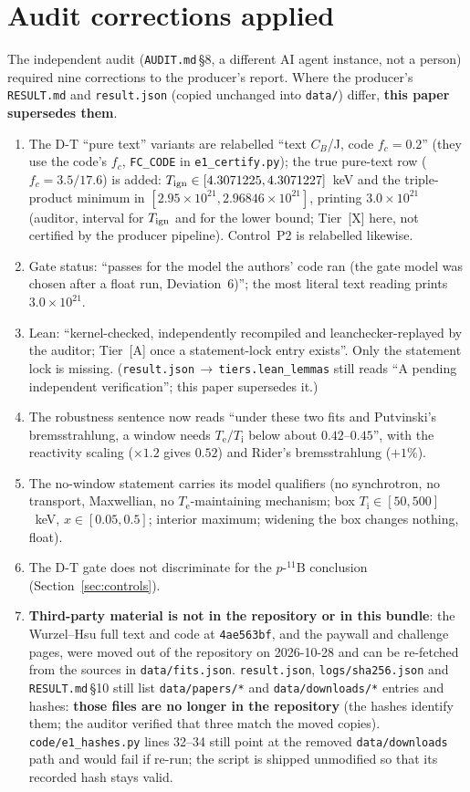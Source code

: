 \documentclass[10pt]{article}
\newcommand{\tier}[1]{\textsf{[#1]}}
\newcommand{\tA}{\tier{A}}
\newcommand{\tX}{\tier{X}}
\newcommand{\Te}{T_{\mathrm e}}
\newcommand{\Ti}{T_{\mathrm i}}
\newcommand{\pB}{p\text{-}{}^{11}\mathrm{B}}
\begin{document}
\section{Audit corrections applied}\label{sec:corr}
The independent audit (\texttt{AUDIT.md}\,\S8, a different AI agent instance, not a person) required nine corrections to the producer's report. Where the producer's \texttt{RESULT.md} and \texttt{result.json} (copied unchanged into \texttt{data/}) differ, \textbf{this paper supersedes them}.
\begin{enumerate}\itemsep=1pt
\item[C1.] The D-T ``pure text'' variants are relabelled ``text $C_B$/J, code $f_c=0.2$'' (they use the code's $f_c$, \texttt{FC\_CODE} in \texttt{e1\_certify.py}); the true pure-text row ($f_c=3.5/17.6$) is added: $T_{\rm ign}\in[4.3071225,4.3071227]$~keV and the triple-product minimum in $[2.95\times10^{21},2.96846\times10^{21}]$, printing $3.0\times10^{21}$ (auditor, interval for $T_{\rm ign}$ and for the lower bound; Tier~\tX{} here, not certified by the producer pipeline). Control~P2 is relabelled likewise.
\item[C2.] Gate status: ``passes for the model the authors' code ran (the gate model was chosen after a float run, Deviation~6)''; the most literal text reading prints $3.0\times10^{21}$.
\item[C3.] Lean: ``kernel-checked, independently recompiled and leanchecker-replayed by the auditor; Tier~\tA{} once a statement-lock entry exists''. Only the statement lock is missing. (\texttt{result.json}\,$\to$\,\texttt{tiers.lean\_lemmas} still reads ``A pending independent verification''; this paper supersedes it.)
\item[C4.] The robustness sentence now reads ``under these two fits and Putvinski's bremsstrahlung, a window needs $\Te/\Ti$ below about $0.42$--$0.45$'', with the reactivity scaling ($\times1.2$ gives $0.52$) and Rider's bremsstrahlung ($+1\%$).
\item[C5.] The no-window statement carries its model qualifiers (no synchrotron, no transport, Maxwellian, no $\Te$-maintaining mechanism; box $\Ti\in[50,500]$~keV, $x\in[0.05,0.5]$; interior maximum; widening the box changes nothing, float).
\item[C6.] The D-T gate does not discriminate for the $\pB$ conclusion (Section~\ref{sec:controls}).
\item[C7.] \textbf{Third-party material is not in the repository or in this bundle}: the Wurzel--Hsu full text and code at \texttt{4ae563bf}, and the paywall and challenge pages, were moved out of the repository on 2026-10-28 and can be re-fetched from the sources in \texttt{data/fits.json}. \texttt{result.json}, \texttt{logs/sha256.json} and \texttt{RESULT.md}\,\S10 still list \texttt{data/papers/*} and \texttt{data/downloads/*} entries and hashes: \textbf{those files are no longer in the repository} (the hashes identify them; the auditor verified that three match the moved copies). \texttt{code/e1\_hashes.py} lines 32--34 still point at the removed \texttt{data/downloads} path and would fail if re-run; the script is shipped unmodified so that its recorded hash stays valid.

\end{enumerate}
\end{document}
